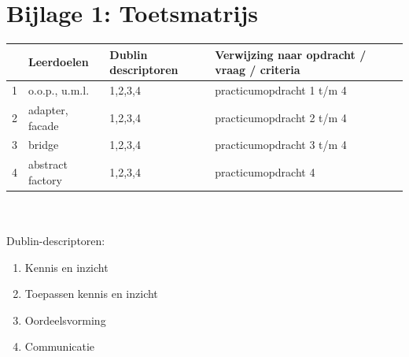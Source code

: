 \documentclass[titlepage,a4paper, 11pt]{article}
\begin{document}
\section{Bijlage 1: Toetsmatrijs}
\begin{tabular}{|p{1cm}|p{4cm}|p{4cm}|p{4cm}|}
\hline
&Leerdoelen&Dublin descriptoren&Verwijzing naar opdracht / vraag / criteria\\
\hline
1&o.o.p., u.m.l.&1,2,3,4&practicumopdracht 1 t/m 4\\
\hline
2&adapter, facade&1,2,3,4&practicumopdracht 2 t/m 4\\
\hline
3&bridge&1,2,3,4&practicumopdracht 3 t/m 4\\
\hline
4&abstract factory&1,2,3,4&practicumopdracht 4\\
\hline
\end{tabular}\\
\vspace{1cm}\\
Dublin-descriptoren:
\begin{enumerate}
\item Kennis en inzicht
\item Toepassen kennis en inzicht
\item Oordeelsvorming
\item Communicatie
\end{enumerate}
\newpage
\end{document}

